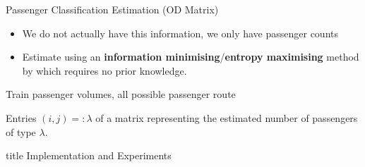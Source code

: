 \documentclass[handout]{beamer}
\begin{document}
            
\begin{frame}{Passenger Classification Estimation (OD Matrix)}
\begin{itemize}
    \item We do not actually have this information, we only have passenger counts
    \item Estimate using an \textbf{information minimising}/\textbf{entropy maximising} method by \cite{van_zuylen_willumsen_2002} which requires no prior knowledge.\pause
\end{itemize}

\begin{tcolorbox}[colback=blue!5!white,colframe=blue!75!black,title=Input]
 Train passenger volumes, all possible passenger route
\end{tcolorbox}

\begin{tcolorbox}[colback=yellow!5!white,colframe=yellow!75!black,title=Output]
 Entries $(i,j)=:\lambda$ of a matrix representing the 
 estimated number of passengers of type $\lambda$.
\end{tcolorbox}

\end{frame}


\begin{frame}
  \vfill
  \centering
  \begin{beamercolorbox}[sep=8pt,center,shadow=true,rounded=true]{title}
     Implementation and Experiments \par%
  \end{beamercolorbox}
  \vfill
  \end{frame}
  
\end{document}
